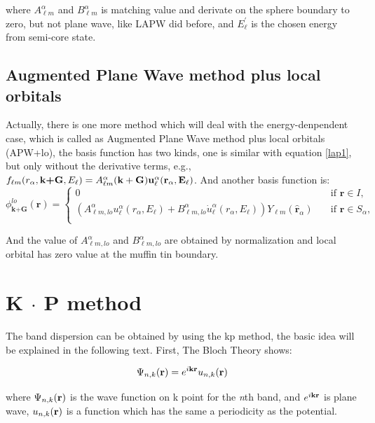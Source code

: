 \documentclass[a4paper]{report}
\begin{document}
\noindent where $A _{{\ell}m}^{\alpha}$ and $B _{{\ell}m}^{\alpha}$ is matching value and derivate on the sphere boundary to zero, but not plane wave, like LAPW did before, and $E^{\prime}_{\ell}$ is
the chosen energy from semi-core state.

\section{Augmented Plane Wave method plus local orbitals}
\noindent Actually, there is one more method which will deal with the energy-denpendent case, which is called as Augmented Plane Wave method plus local orbitals (APW+lo), the 
basis function has two kinds, one is similar with equation \ref{lap1}, but only without the derivative terms, e.g., $f_{{\ell}{m}} (r_{\alpha},\textbf{k+G} ,E_{\ell}) =  A _{{\ell}m}^{\alpha} \bf(k+G) u_{{\ell}}^{\alpha}(r_{\alpha}, E_{\ell})$.
And another basis function is:
\begin{equation*}\label{lap3}
\phi^{lo}_\textbf{k+G} (\textbf{r})= 
\begin{cases} 0 & \quad \mbox{if $\textbf{r} \in I, $}
\\
(A _{{\ell}m,lo}^{\alpha}  u_{{\ell}}^{\alpha}(r_{\alpha}, E_{\ell}) + B _{{\ell}m,lo}^{\alpha}  \dot{u}_{{\ell}}^{\alpha}(r_{\alpha}, E_{\ell}) ){Y_{{\ell}m}(\hat{\textbf{r}}_{\alpha})} & \quad \mbox{if $\textbf{r} \in S_\alpha, $}\\ 
\end{cases}
\end{equation*}
 
\noindent And the value of $A _{{\ell}m,lo}^{\alpha}$ and $B _{{\ell}m,lo}^{\alpha}$ are obtained by normalization and local orbital has zero value at the muffin tin boundary.

\chapter{K $\cdot$ P method}



The band dispersion can be obtained by using the kp method, the basic idea will be explained in the following text.
First, The Bloch Theory shows:

\begin{equation}\label{1}
 \wfbloch<n><k> = \expg<k> \ubloch<n><k>
\end{equation}

where $\wfbloch<n><k>$ is the wave function on k point for the {\it n}th band, and $\expg<k>$ is plane wave, $\ubloch<n><k>$ is a function which has the same a periodicity as the potential.
\end{document}
